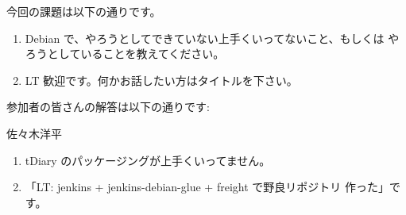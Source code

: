 \documentclass[mingoth,a4paper]{jsarticle}
\begin{document}
今回の課題は以下の通りです。
\begin{screen}
  \begin{enumerate}
  \item %
    Debian で、やろうとしてできていない上手くいってないこと、もしくは
    やろうとしていることを教えてください。

  \item %
    LT 歓迎です。何かお話したい方はタイトルを下さい。
  \end{enumerate}
\end{screen}

参加者の皆さんの解答は以下の通りです:

\begin{prework}{ 佐々木洋平 }
  \begin{enumerate}
  \item tDiary のパッケージングが上手くいってません。
  \item 「LT: jenkins + jenkins-debian-glue + freight で野良リポジトリ
    作った」です。
  \end{enumerate}
\end{prework}
\end{document}
